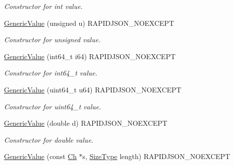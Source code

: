 \begin{DoxyCompactItemize}
\begin{DoxyCompactList}\small\item\em Constructor for int value. \end{DoxyCompactList}\item 
\hypertarget{class_generic_value_a972bff6c56ac3d04622ff7fad8d98331}{}\hyperlink{class_generic_value_a972bff6c56ac3d04622ff7fad8d98331}{Generic\+Value} (unsigned u) R\+A\+P\+I\+D\+J\+S\+O\+N\+\_\+\+N\+O\+E\+X\+C\+E\+P\+T\label{class_generic_value_a972bff6c56ac3d04622ff7fad8d98331}

\begin{DoxyCompactList}\small\item\em Constructor for unsigned value. \end{DoxyCompactList}\item 
\hypertarget{class_generic_value_a964b69f1d2596f75ded5421b6db01a14}{}\hyperlink{class_generic_value_a964b69f1d2596f75ded5421b6db01a14}{Generic\+Value} (int64\+\_\+t i64) R\+A\+P\+I\+D\+J\+S\+O\+N\+\_\+\+N\+O\+E\+X\+C\+E\+P\+T\label{class_generic_value_a964b69f1d2596f75ded5421b6db01a14}

\begin{DoxyCompactList}\small\item\em Constructor for int64\+\_\+t value. \end{DoxyCompactList}\item 
\hypertarget{class_generic_value_ad04805a57f5050c8e04be469ba64d6f3}{}\hyperlink{class_generic_value_ad04805a57f5050c8e04be469ba64d6f3}{Generic\+Value} (uint64\+\_\+t u64) R\+A\+P\+I\+D\+J\+S\+O\+N\+\_\+\+N\+O\+E\+X\+C\+E\+P\+T\label{class_generic_value_ad04805a57f5050c8e04be469ba64d6f3}

\begin{DoxyCompactList}\small\item\em Constructor for uint64\+\_\+t value. \end{DoxyCompactList}\item 
\hypertarget{class_generic_value_a267d05b7e98c3507908eaf085fe41155}{}\hyperlink{class_generic_value_a267d05b7e98c3507908eaf085fe41155}{Generic\+Value} (double d) R\+A\+P\+I\+D\+J\+S\+O\+N\+\_\+\+N\+O\+E\+X\+C\+E\+P\+T\label{class_generic_value_a267d05b7e98c3507908eaf085fe41155}

\begin{DoxyCompactList}\small\item\em Constructor for double value. \end{DoxyCompactList}\item 
\hypertarget{class_generic_value_a4d9af98141360cd801daab4ed1ca2c91}{}\hyperlink{class_generic_value_a4d9af98141360cd801daab4ed1ca2c91}{Generic\+Value} (const \hyperlink{class_generic_value_ade0e0ce64ccd5d852da57a35e720bafb}{Ch} $\ast$s, \hyperlink{rapidjson_8h_a5ed6e6e67250fadbd041127e6386dcb5}{Size\+Type} length) R\+A\+P\+I\+D\+J\+S\+O\+N\+\_\+\+N\+O\+E\+X\+C\+E\+P\+T\label{class_generic_value_a4d9af98141360cd801daab4ed1ca2c91}


\end{DoxyCompactItemize}
